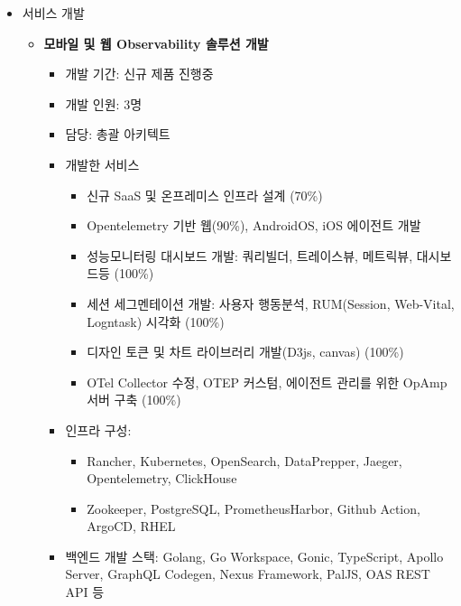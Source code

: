 

\begin{itemize}[label=]
	\item 서비스 개발
	      \begin{itemize}[label=]
		      \item \textbf{모바일 및 웹 Observability 솔루션 개발} \hyperref[bhplf]{\space {}}
		            \begin{itemize}[label=]
			            \item 개발 기간: 신규 제품 진행중
			            \item 개발 인원: 3명
			            \item 담당: 총괄 아키텍트
			            \item 개발한 서비스
			                  \begin{itemize}
				                  \item 신규 SaaS 및 온프레미스 인프라 설계 (70\%)
				                  \item Opentelemetry 기반 웹(90\%), AndroidOS, iOS 에이전트 개발
				                  \item 성능모니터링 대시보드 개발: 쿼리빌더, 트레이스뷰, 메트릭뷰, 대시보드등 (100\%)
				                  \item 세션 세그멘테이션 개발: 사용자 행동분석, RUM(Session, Web-Vital, Logntask) 시각화 (100\%)
				                  \item 디자인 토큰 및 차트 라이브러리 개발(D3js, canvas) (100\%)
				                  \item OTel Collector 수정, OTEP 커스텀, 에이전트 관리를 위한 OpAmp 서버 구축 (100\%)
			                  \end{itemize}
			            \item 인프라 구성:
			                  \begin{itemize}
				                  \item Rancher, Kubernetes, OpenSearch, DataPrepper, Jaeger, Opentelemetry, ClickHouse
				                  \item Zookeeper, PostgreSQL, PrometheusHarbor, Github Action, ArgoCD, RHEL
			                  \end{itemize}
			            \item 백엔드 개발 스택: Golang, Go Workspace, Gonic, TypeScript, Apollo Server, GraphQL Codegen, Nexus Framework, PalJS, OAS REST API 등

\end{itemize}
\end{itemize}
\end{itemize}
